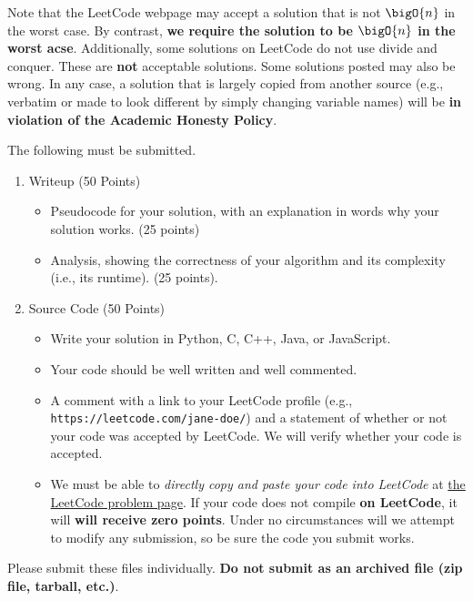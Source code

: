 \documentclass[draft]{article}
\begin{document}
\begin{titlepage}
    Note that the LeetCode webpage may accept a solution that is not $\bigO{n}$ in the worst case. By contrast, \textbf{we require the solution to be $\bigO{n}$ in the worst acse}. Additionally, some solutions on LeetCode do not use divide and conquer. These are \textbf{not} acceptable solutions. Some solutions posted may also be wrong. In any case,
    a solution that is largely copied from another source (e.g., verbatim or made to look different by simply changing variable names) will be \textbf{in violation of the Academic Honesty Policy}.

    The following must be submitted.
    \begin{enumerate}[label=\textbf{(\alph*)}]
        \item Writeup (50 Points)
              \begin{itemize}
                  \item Pseudocode for your solution, with an explanation in words why your solution works. (25 points)
                  \item Analysis, showing the correctness of your algorithm and its  complexity (i.e., its runtime). (25 points).
              \end{itemize}
        \item Source Code (50 Points)
              \begin{itemize}
                  \item Write your solution in Python, C, C++, Java, or JavaScript.
                  \item Your code should be well written and well commented.
                  \item A comment with a link to your LeetCode profile (e.g., \texttt{https://leetcode.com/jane-doe/}) and a statement of whether or not your code was accepted by LeetCode. We will verify whether your code is accepted.
                  \item We must be able to \emph{directly copy and paste your code into LeetCode} at \href{https://leetcode.com/problems/k-closest-points-to-origin/}{the LeetCode problem page}. If your code does not compile \textbf{on LeetCode}, it will \textbf{will receive zero points}. Under no circumstances will we attempt to modify any submission, so be sure the code you submit works.
              \end{itemize}
    \end{enumerate}
    Please submit these files individually. \textbf{Do not submit as an archived file (zip file, tarball, etc.)}.
\end{titlepage}
\end{document}
